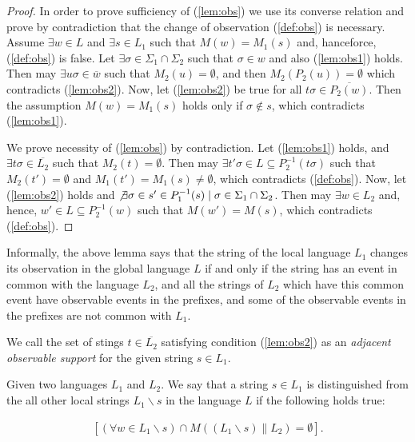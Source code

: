 \documentclass[a4paper, 10pt, conference]{ieeeconf}
\begin{document}
\begin{proof}
In order to prove sufficiency of (\ref{lem:obs}) we use its converse relation
and prove by contradiction that the change of observation (\ref{def:obs}) is
necessary.
Assume $\exists w \in L$ and $\exists s \in L_1$ such that
$M(w)= M_1(s)$ and, hanceforce, (\ref{def:obs}) is false. Let $\exists
\sigma \in \Sigma_1 \cap \Sigma_2$ such that $\sigma \in w$ and also
(\ref{lem:obs1}) holds. Then may $\exists u \sigma \in \overline{w}$ such that
$M_2(u) = \emptyset$, and then $M_2(P_2(u)) =
\emptyset$ which contradicts (\ref{lem:obs2}). Now, let (\ref{lem:obs2})
be true for all $t\sigma \in \overline{P_2(w)}$. Then the assumption $M(w)=
M_1(s)$ holds only if $\sigma \not \in s$, which contradicts (\ref{lem:obs1}). 

We prove necessity of (\ref{lem:obs}) by contradiction.
Let (\ref{lem:obs1}) holds, and $\exists t\sigma \in \overline{L_2}$ such that
$M_2(t) = \emptyset$. Then may $\exists t'\sigma \in 
L \subseteq P_2^{-1}(t\sigma)$ such that $M_2(t') =
\emptyset$ and $M_1(t') = M_1(s) \neq \emptyset$, which contradicts
(\ref{def:obs}).
Now, let (\ref{lem:obs2}) holds and $\not \exists \sigma \in s' \in P_1^{-1}(s)
\mid \sigma \in \Sigma_1 \cap \Sigma_2$. Then may $\exists w \in L_2$ and,
hence, $w' \in L \subseteq P_2^{-1}(w)$ such that $M(w')=M(s)$,
which contradicts (\ref{def:obs}).
\end{proof}

Informally, the above lemma says that the string of the local language $L_1$
changes its observation in the global language $L$ if and only if the string has
an event in common with the language $L_2$, and all the strings of $L_2$ which
have this common event have observable events in the prefixes, and some of the
observable events in the prefixes are not common with $L_1$.

We call the set of stings $t \in \overline{L_2}$ satisfying condition
(\ref{lem:obs2}) as an \emph{adjacent observable support} for the given string
$s \in L_1$.

\begin{definition} Given two languages $L_1$ and $L_2$. We say that a string $s
\in L_{1}$ is distinguished from the all other local strings $L_1\backslash s$
in the language $L$ if the following holds true:
\end{definition}
\begin{equation}
\label{def:dist}
\begin{array}{l}
	\left[
		(\forall w \in L_1\backslash s) \cap M((L_1\backslash s) \parallel L_2) 
		= \emptyset
	\right].
\end{array}
\end{equation}
\end{document}
